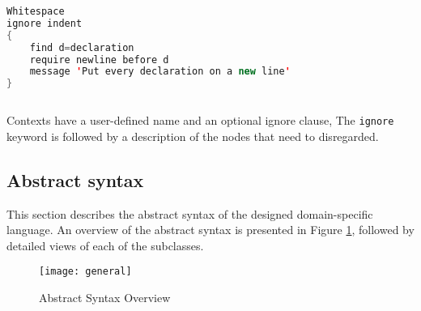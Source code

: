 \documentclass[parskip=full]{uvamscse}
\begin{document}
\begin{sourcecode}
\begin{lstlisting}[style=mono,language=Java]
Whitespace
ignore indent 
{
    find d=declaration
    require newline before d
    message 'Put every declaration on a new line'
}
\end{lstlisting}
\end{sourcecode}

Contexts have a user-defined name and an optional ignore clause, The \texttt{ignore} keyword is
followed by a description of the nodes that need to disregarded.

\subsection{Abstract syntax}

This section describes the abstract syntax of the designed domain-specific language. An overview of
the abstract syntax is presented in Figure \ref{fig:astgeneral}, followed by detailed views of each
of the subclasses.

\begin{figure}[h!]
  \centering
  \caption{Abstract Syntax Overview}
  \label{fig:astgeneral}
  \texttt{[image: general]}
\end{figure}
\end{document}
